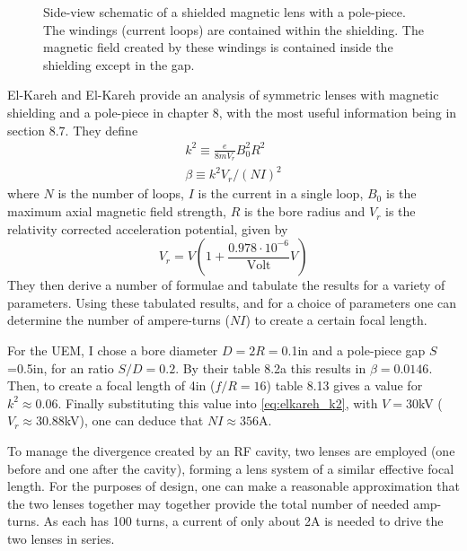 \begin{figure}
  \centering
  
  \caption[Side-view schematic of a shielded magnetic lens with a pole-piece]{
    Side-view schematic of a shielded magnetic lens with a pole-piece.
    The windings (current loops) are contained within the shielding.
    The magnetic field created by these windings is contained inside the shielding except in the gap.
  }
\end{figure}

El-Kareh and El-Kareh \cite{el-kareh_electron_1970} provide an analysis of symmetric lenses with magnetic shielding and a pole-piece in chapter 8, with the most useful information being in section 8.7.
They define
\begin{subequations}
\begin{gather}
  k^2 \equiv \frac{e}{8 m V_r} B_0^2 R^2 \\
  \beta \equiv k^2 V_r / (NI)^2 \label{eq:elkareh_k2}
\end{gather}
\end{subequations}
where $N$ is the number of loops, $I$ is the current in a single loop, $B_0$ is the maximum axial magnetic field strength, $R$ is the bore radius and $V_r$ is the relativity corrected acceleration potential, given by
\begin{equation}
  V_r = V ( 1 + \frac{0.978 \cdot 10^{-6}}{\text{Volt}} V )
\end{equation}
They then derive a number of formulae and tabulate the results for a variety of parameters.
Using these tabulated results, and for a choice of parameters one can determine the number of ampere-turns ($NI$) to create a certain focal length.

For the UEM, I chose a bore diameter $D=2R=$0.1in and a pole-piece gap $S$=0.5in, for an ratio $S/D=0.2$.
By their table 8.2a this results in $\beta=0.0146$. Then, to create a focal length of 4in ($f/R=16$) table 8.13 gives a value for $k^2 \approx 0.06$.
Finally substituting this value into \ref{eq:elkareh_k2}, with $V=30$kV ($V_r\approx30.88$kV), one can deduce that $NI\approx356$A.

To manage the divergence created by an RF cavity, two lenses are employed (one before and one after the cavity), forming a lens system of a similar effective focal length.
For the purposes of design, one can make a reasonable approximation that the two lenses together may together provide the total number of needed amp-turns.
As each has 100 turns, a current of only about 2A is needed to drive the two lenses in series.

